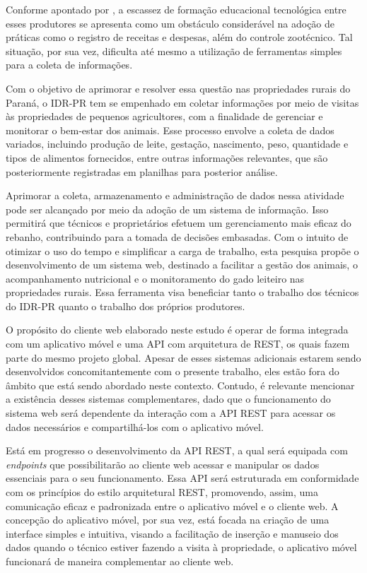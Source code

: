 Conforme apontado por , a escassez de formação educacional tecnológica entre esses produtores se apresenta como um obstáculo considerável na adoção de práticas como o registro de receitas e despesas, além do controle zootécnico. Tal situação, por sua vez, dificulta até mesmo a utilização de ferramentas simples para a coleta de informações.

Com o objetivo de aprimorar e resolver essa questão nas propriedades rurais do Paraná, o \gls{IDR-PR} tem se empenhado em coletar informações por meio de visitas às propriedades de pequenos agricultores, com a finalidade de gerenciar e monitorar o bem-estar dos animais. Esse processo envolve a coleta de dados variados, incluindo produção de leite, gestação, nascimento, peso, quantidade e tipos de alimentos fornecidos, entre outras informações relevantes, que são posteriormente registradas em planilhas para posterior análise.

Aprimorar a coleta, armazenamento e administração de dados nessa atividade pode ser alcançado por meio da adoção de um sistema de informação. Isso permitirá que técnicos e proprietários efetuem um gerenciamento mais eficaz do rebanho, contribuindo para a tomada de decisões embasadas. Com o intuito de otimizar o uso do tempo e simplificar a carga de trabalho, esta pesquisa propõe o desenvolvimento de um sistema web, destinado a facilitar a gestão dos animais, o acompanhamento nutricional e o monitoramento do gado leiteiro nas propriedades rurais. Essa ferramenta visa beneficiar tanto o trabalho dos técnicos do \gls{IDR-PR} quanto o trabalho dos próprios produtores.

O propósito do cliente web elaborado neste estudo é operar de forma integrada com um aplicativo móvel e uma \gls{API} com arquitetura de \gls{REST}, os quais fazem parte do mesmo projeto global. Apesar de esses sistemas adicionais estarem sendo desenvolvidos concomitantemente com o presente trabalho, eles estão fora do âmbito que está sendo abordado neste contexto. Contudo, é relevante mencionar a existência desses sistemas complementares, dado que o funcionamento do sistema web será dependente da interação com a \gls{API} \gls{REST} para acessar os dados necessários e compartilhá-los com o aplicativo móvel.

Está em progresso o desenvolvimento da \gls{API} \gls{REST}, a qual será equipada com \textit{endpoints} que possibilitarão ao cliente web acessar e manipular os dados essenciais para o seu funcionamento. Essa \gls{API} será estruturada em conformidade com os princípios do estilo arquitetural \gls{REST}, promovendo, assim, uma comunicação eficaz e padronizada entre o aplicativo móvel e o cliente web. A concepção do aplicativo móvel, por sua vez, está focada na criação de uma interface simples e intuitiva, visando a facilitação de inserção e manuseio dos dados quando o técnico estiver fazendo a visita à propriedade, o aplicativo móvel funcionará de maneira complementar ao cliente web.


